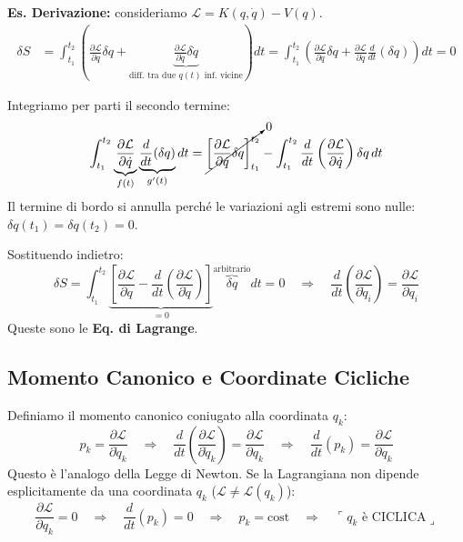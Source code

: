 \documentclass[11pt, a4paper]{article}
\begin{document}
\textbf{Es. Derivazione:} consideriamo $\mathcal{L} = K(q, \dot{q}) - V(q)$.
\begin{align*}
    \delta S &= \int_{t_1}^{t_2} \left( \frac{\partial \mathcal{L}}{\partial q}\delta q + \underbrace{\frac{\partial \mathcal{L}}{\partial \dot{q}}\delta \dot{q}}_{\text{diff. tra due } q(t) \text{ inf. vicine}} \right) dt = \int_{t_1}^{t_2} \left( \frac{\partial \mathcal{L}}{\partial q}\delta q + \frac{\partial \mathcal{L}}{\partial \dot{q}} \frac{d}{dt}(\delta q) \right) dt = 0
\end{align*}

Integriamo per parti il secondo termine:
\begin{equation*}
    \int_{t_1}^{t_2} \underbrace{\frac{\partial \mathcal{L}}{\partial \dot{q}}}_{f(t)} \underbrace{\frac{d}{dt}(\delta q)}_{g'(t)} dt = \cancelto{0}{\left[ \frac{\partial \mathcal{L}}{\partial \dot{q}} \delta q \right]_{t_1}^{t_2}} - \int_{t_1}^{t_2} \frac{d}{dt}\left(\frac{\partial \mathcal{L}}{\partial \dot{q}}\right) \delta q \, dt
\end{equation*}
Il termine di bordo si annulla perché le variazioni agli estremi sono nulle: $\delta q(t_1) = \delta q(t_2) = 0$.

Sostituendo indietro:
\begin{equation}
    \delta S = \int_{t_1}^{t_2} \underbrace{\left[ \frac{\partial \mathcal{L}}{\partial q} - \frac{d}{dt}\left(\frac{\partial \mathcal{L}}{\partial \dot{q}}\right) \right]}_{= 0} \overbrace{\delta q}^{\text{arbitrario}} dt = 0 \quad \Rightarrow \quad \boxed{ \frac{d}{dt}\left(\frac{\partial \mathcal{L}}{\partial \dot{q}_i}\right) = \frac{\partial \mathcal{L}}{\partial q_i} }
\end{equation}
Queste sono le \textbf{Eq. di Lagrange}.

\subsection{Momento Canonico e Coordinate Cicliche}
Definiamo il momento canonico coniugato alla coordinata $q_k$:
\begin{equation}
    p_k = \frac{\partial \mathcal{L}}{\partial \dot{q}_k} \quad \Rightarrow \quad \frac{d}{dt}\left(\frac{\partial \mathcal{L}}{\partial \dot{q}_k}\right) = \frac{\partial \mathcal{L}}{\partial q_k} \quad \Rightarrow \quad \frac{d}{dt}(p_k) = \frac{\partial \mathcal{L}}{\partial q_k}
\end{equation}
Questo è l'analogo della Legge di Newton. Se la Lagrangiana non dipende esplicitamente da una coordinata $q_k$ ($\mathcal{L} \neq \mathcal{L}(q_k)$):
\begin{equation}
    \frac{\partial \mathcal{L}}{\partial q_k} = 0 \quad \Rightarrow \quad \frac{d}{dt}(p_k) = 0 \quad \Rightarrow \quad p_k = \text{cost} \quad \Rightarrow \quad \ulcorner q_k \text{ è CICLICA} \lrcorner
\end{equation}
\end{document}
